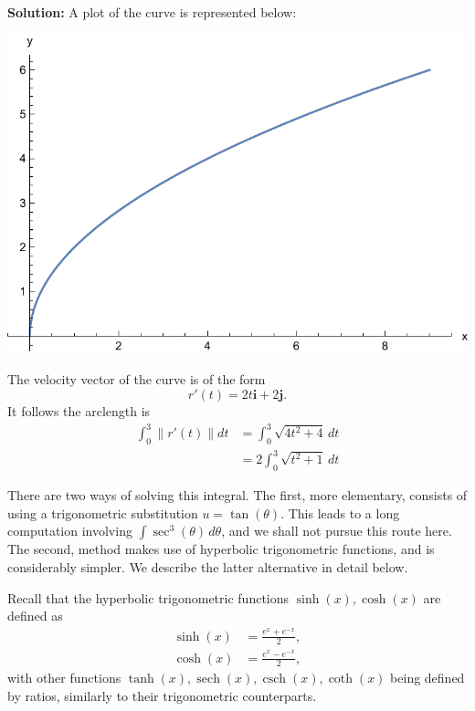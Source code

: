 \documentclass[12pt,oneside]{exam}
\newenvironment{newsolution}{\vspace{.1in}\noindent\textbf{Solution: \hspace{.05em}}}{}
\DeclareMathOperator{\sech}{sech}
\DeclareMathOperator{\csch}{csch}
\begin{document}
\begin{newsolution}
A plot of the curve is represented below:
\begin{center}
\includegraphics[scale=0.5]{p6.pdf}
\end{center}

The velocity vector of the curve is of the form
\begin{equation*}
r'(t) = 2t\mathbf{i} + 2\mathbf{j}.
\end{equation*}
It follows the arclength is 
\begin{align*}
\int_{0}^{3} \| r'(t)\| dt & = \int_{0}^{3} \sqrt{4t^2+4} \, dt \\
& = 2\int_{0}^{3} \sqrt{t^2+1} \, dt
\end{align*}

There are two ways of solving this integral. The first, more elementary, consists of using a trigonometric substitution $u = \tan(\theta)$. This leads to a long computation involving $\int \sec^3(\theta) \, d\theta$, and we shall not pursue this route here. The second, method makes use of hyperbolic trigonometric functions, and is considerably simpler. We describe the latter alternative in detail below.

Recall that the hyperbolic trigonometric functions $\sinh(x), \cosh(x)$ are defined as 
\begin{align*}
\sinh(x) & = \frac{e^{x}+e^{-x}}{2}, \\
\cosh(x) & = \frac{e^{x}-e^{-x}}{2},
\end{align*}
with other functions $\tanh(x), \sech(x), \csch(x), \coth(x)$ being defined by ratios, similarly to their trigonometric counterparts. 


\end{newsolution}
\end{document}
